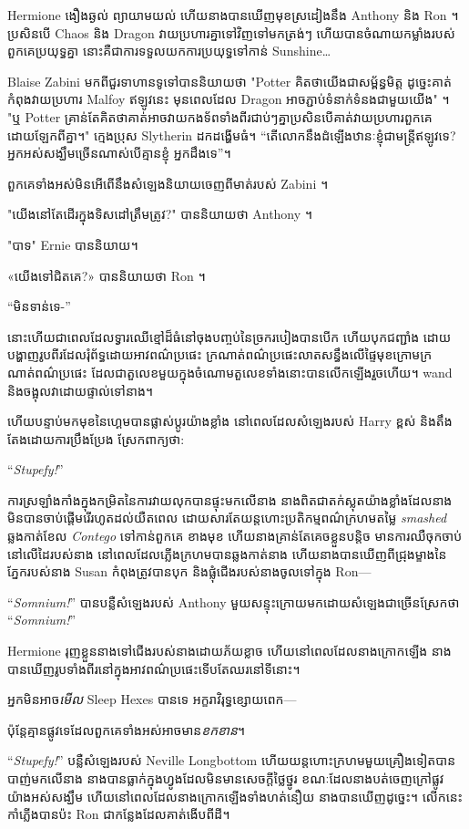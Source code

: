 Hermione ងឿងឆ្ងល់ ព្យាយាមយល់ ហើយនាងបានឃើញមុខស្រដៀងនឹង Anthony និង Ron ។ ប្រសិនបើ Chaos និង Dragon វាយប្រហារគ្នាទៅវិញទៅមកត្រង់ៗ ហើយបានចំណាយកម្លាំងរបស់ពួកគេប្រយុទ្ធគ្នា នោះគឺជាការទទួលយកការប្រយុទ្ធទៅកាន់ Sunshine…

Blaise Zabini មកពីជួរទាហានទូទៅបាននិយាយថា "Potter គិតថាយើងជាសម្ព័ន្ធមិត្ត ដូច្នេះគាត់កំពុងវាយប្រហារ Malfoy ឥឡូវនេះ មុនពេលដែល Dragon អាចភ្ជាប់ទំនាក់ទំនងជាមួយយើង" ។ "ឬ Potter គ្រាន់តែគិតថាគាត់អាចវាយកងទ័ពទាំងពីរជាប់ៗគ្នាប្រសិនបើគាត់វាយប្រហារពួកគេដោយឡែកពីគ្នា។" ក្មេងប្រុស Slytherin ដកដង្ហើមធំ។ “តើ​លោក​នឹង​ដំឡើង​ឋានៈ​ខ្ញុំ​ជា​មន្ត្រី​ឥឡូវ​ទេ? អ្នកអស់សង្ឃឹមច្រើនណាស់បើគ្មានខ្ញុំ អ្នកដឹងទេ”។

ពួកគេទាំងអស់មិនអើពើនឹងសំឡេងនិយាយចេញពីមាត់របស់ Zabini ។

"យើងនៅតែដើរក្នុងទិសដៅត្រឹមត្រូវ?" បាននិយាយថា Anthony ។

"បាទ" Ernie បាននិយាយ។

«យើងទៅជិតគេ?» បាននិយាយថា Ron ។

“មិនទាន់ទេ-”

នោះហើយជាពេលដែលទ្វារឈើខ្មៅដ៏ធំនៅចុងបញ្ចប់នៃច្រករបៀងបានបើក ហើយបុកជញ្ជាំង ដោយបង្ហាញរូបពីរដែលរុំព័ទ្ធដោយអាវពណ៌ប្រផេះ ក្រណាត់ពណ៌ប្រផេះលាតសន្ធឹងលើផ្ទៃមុខក្រោមក្រណាត់ពណ៌ប្រផេះ ដែលជាតួលេខមួយក្នុងចំណោមតួលេខទាំងនោះបានលើកឡើងរួចហើយ។ wand និងចង្អុលវាដោយផ្ទាល់ទៅនាង។

ហើយបន្ទាប់មកមុខនៃហ្គេមបានផ្លាស់ប្តូរយ៉ាងខ្លាំង នៅពេលដែលសំឡេងរបស់ Harry ខ្ពស់ និងតឹងតែងដោយការប្រឹងប្រែង ស្រែកពាក្យថា:

“\emph{Stupefy!}”

ការស្រឡាំងកាំងក្នុងកម្រិតនៃការវាយលុកបានផ្ទុះមកលើនាង នាងពិតជាតក់ស្លុតយ៉ាងខ្លាំងដែលនាងមិនបានចាប់ផ្តើមរើរហូតដល់យឺតពេល ដោយសារតែយន្តហោះប្រតិកម្មពណ៌ក្រហមតម្លៃ \emph{smashed} ឆ្លងកាត់ខែល \emph{Contego} ទៅកាន់ពួកគេ ខាងមុខ ហើយនាងគ្រាន់តែគេចខ្លួនបន្តិច មានការឈឺចុកចាប់នៅលើដៃរបស់នាង នៅពេលដែលភ្លើងក្រហមបានឆ្លងកាត់នាង ហើយនាងបានឃើញពីជ្រុងម្ខាងនៃភ្នែករបស់នាង Susan កំពុងត្រូវបានបុក និងផ្លុំជើងរបស់នាងចូលទៅក្នុង Ron—

“\emph{Somnium!}” បានបន្លឺសំឡេងរបស់ Anthony មួយសន្ទុះក្រោយមកដោយសំឡេងជាច្រើនស្រែកថា “\emph{Somnium!}”

Hermione រុញខ្លួននាងទៅជើងរបស់នាងដោយភ័យខ្លាច ហើយនៅពេលដែលនាងក្រោកឡើង នាងបានឃើញរូបទាំងពីរនៅក្នុងអាវពណ៌ប្រផេះទើបតែឈរនៅទីនោះ។

អ្នកមិនអាច\emph{មើល} Sleep Hexes បានទេ អក្ខរាវិរុទ្ធខ្សោយពេក—

ប៉ុន្តែ​គ្មាន​ផ្លូវ​ទេ​ដែល​ពួកគេ​ទាំងអស់​អាច​មាន​\emph{ខកខាន}។

“\emph{Stupefy!}” បន្លឺសំឡេងរបស់ Neville Longbottom ហើយយន្តហោះក្រហមមួយគ្រឿងទៀតបានបាញ់មកលើនាង នាងបានធ្លាក់ក្នុងហ្វូងដែលមិនមានសេចក្តីថ្លៃថ្នូរ ខណៈដែលនាងបត់ចេញក្រៅផ្លូវយ៉ាងអស់សង្ឃឹម ហើយនៅពេលដែលនាងក្រោកឡើងទាំងហត់នឿយ នាងបានឃើញដូច្នេះ។ លើក​នេះ​កាំ​ភ្លើង​បាន​ប៉ះ Ron ជា​កន្លែង​ដែល​គាត់​ងើប​ពី​ដី។

